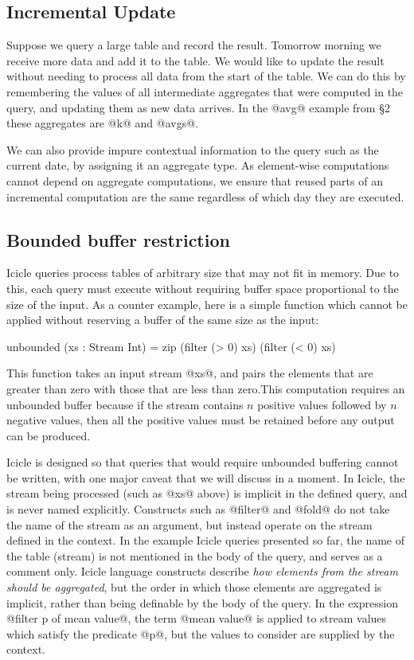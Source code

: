 \subsection{Incremental Update}
Suppose we query a large table and record the result. Tomorrow morning we receive more data and add it to the table. We would like to update the result without needing to process all data from the start of the table. We can do this by remembering the values of all intermediate aggregates that were computed in the query, and updating them as new data arrives. In the @avg@ example from \S2 these aggregates are @k@ and @avgs@. 

We can also provide impure contextual information to the query such as the current date, by assigning it an aggregate type. As element-wise computations cannot depend on aggregate computations, we ensure that reused parts of an incremental computation are the same regardless of which day they are executed.


\subsection{Bounded buffer restriction}
\label{s:IcicleSource:bounded}
Icicle queries process tables of arbitrary size that may not fit in memory. Due to this, each query must execute without requiring buffer space proportional to the size of the input. As a counter example, here is a simple function which cannot be applied without reserving a buffer of the same size as the input:
\begin{code}
    unbounded (xs : Stream Int)
     = zip (filter (> 0) xs) (filter (< 0) xs)
\end{code}

This function takes an input stream @xs@, and pairs the elements that are greater than zero with those that are less than zero.This computation requires an unbounded buffer because if the stream contains $n$ positive values followed by $n$ negative values, then all the positive values must be retained before any output can be produced. 

Icicle is designed so that queries that would require unbounded buffering cannot be written, with one major caveat that we will discuss in a moment. In Icicle, the stream being processed (such as @xs@ above) is implicit in the defined query, and is never named explicitly. Constructs such as @filter@ and @fold@ do not take the name of the stream as an argument, but instead operate on the stream defined in the context. In the example Icicle queries presented so far, the name of the table (stream) is not mentioned in the body of the query, and serves as a comment only. Icicle language constructs describe \emph{how elements from the stream should be aggregated}, but the order in which those elements are aggregated is implicit, rather than being definable by the body of the query. In the expression @filter p of mean value@, the term @mean value@ is applied to stream values which satisfy the predicate @p@, but the values to consider are supplied by the context.

